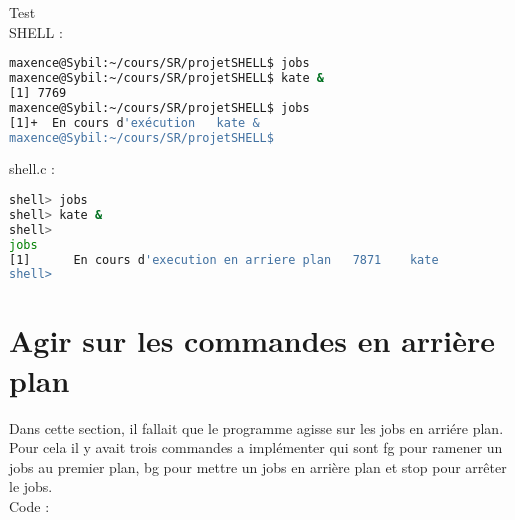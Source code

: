 \documentclass{report}
\begin{document}
			Test \\
			SHELL : 
			\begin{lstlisting}[frame=single,basicstyle=\footnotesize,language=bash]
maxence@Sybil:~/cours/SR/projetSHELL$ jobs
maxence@Sybil:~/cours/SR/projetSHELL$ kate &
[1] 7769
maxence@Sybil:~/cours/SR/projetSHELL$ jobs
[1]+  En cours d'exécution   kate &
maxence@Sybil:~/cours/SR/projetSHELL$ 
			\end{lstlisting}
			shell.c :
			\begin{lstlisting}[frame=single,basicstyle=\footnotesize,language=bash]
shell> jobs
shell> kate &
shell>
jobs
[1] 	 En cours d'execution en arriere plan 	7871 	kate
shell> 
			\end{lstlisting}
		\section{Agir sur les commandes en arri\`ere plan}
		Dans cette section, il fallait que le programme agisse sur les jobs en arri\'ere plan. Pour cela il y avait trois commandes a impl\'ementer qui sont fg pour ramener un jobs au premier plan, bg pour mettre un jobs en arri\`ere plan et stop pour arr\^eter le jobs.\\Code : 
\end{document}
